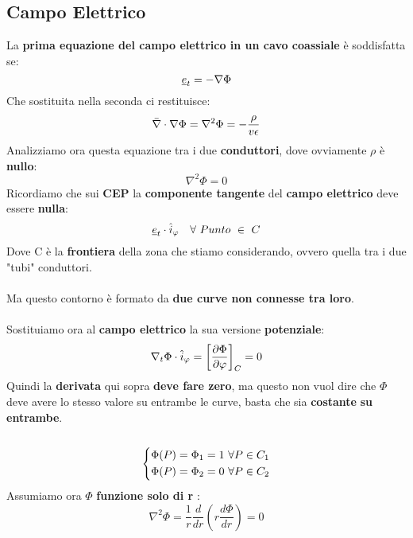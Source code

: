 \subsection{Campo Elettrico}
La \textbf{prima equazione del campo elettrico in un cavo coassiale }è soddisfatta se:
\begin{equation*}
    \underline{e}_t = - \nabla \Phi
\end{equation*}
Che sostituita nella seconda ci restituisce:
\begin{equation*}
    \bar{\nabla} \cdot \nabla \Phi = \nabla^2 \Phi = - \frac{\rho}{v \epsilon}
\end{equation*}
Analizziamo ora questa equazione tra i due \textbf{conduttori}, dove ovviamente $\rho$ è \textbf{nullo}:
\begin{equation*}
    \nabla^2 \Phi = 0
\end{equation*}
Ricordiamo che sui \textbf{CEP} la \textbf{componente tangente} del \textbf{campo elettrico} deve essere \textbf{nulla}:
\begin{equation*}
    \underline{e}_t \cdot \hat{i}_{\varphi} \quad \forall \ Punto \ \in \ C
\end{equation*}
Dove C è la \textbf{frontiera} della zona che stiamo considerando, ovvero quella tra i due "tubi" conduttori.\\ \\
Ma questo contorno è formato da \textbf{due curve non connesse tra loro}.\\ \\
Sostituiamo ora al \textbf{campo elettrico} la sua versione \textbf{potenziale}:
\begin{equation*}
    \nabla_t \Phi \cdot \hat{i}_{\varphi} = \left[\frac{\partial \Phi}{\partial \varphi}\right]_C = 0
\end{equation*}
Quindi la \textbf{derivata} qui sopra \textbf{deve fare zero}, ma questo non vuol dire che $\Phi$ deve avere lo stesso valore su entrambe le curve, basta che sia \textbf{costante} \textbf{su} \textbf{entrambe}.\\ \\
\begin{equation*}
    \begin{dcases}
        \Phi(P) = \Phi_1 = 1 \ \forall P \in C_1\\
        \Phi(P) = \Phi_2 = 0 \ \forall P \in C_2
    \end{dcases}
\end{equation*}
Assumiamo ora $\Phi$ \textbf{funzione solo di r} :
\begin{equation*}
    \nabla^2 \Phi = \frac{1}{r} \frac{d}{dr} \left(r \frac{d \Phi}{dr}\right) = 0
\end{equation*}
